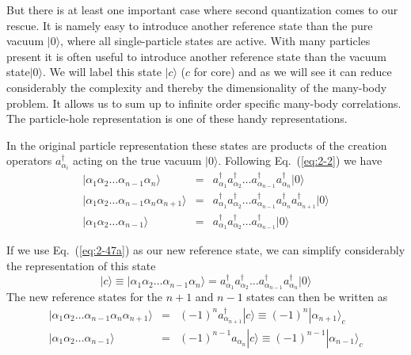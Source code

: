 But there is at least one important case where second quantization comes to our rescue.
It is namely easy to introduce another reference state than the pure vacuum $|0\rangle $, where all single-particle states are active.
With many particles present it is often useful to introduce another reference state  than the vacuum state$|0\rangle $. We will label this state $|c\rangle$ ($c$ for core) and as we will see it can reduce 
considerably the complexity and thereby the dimensionality of the many-body problem. It allows us to sum up to infinite order specific many-body correlations.  The particle-hole representation is one of these handy representations. 

In the original particle representation these states are products of the creation operators  $a_{\alpha_i}^\dagger$ acting on the true vacuum $|0\rangle $.
Following Eq.~(\ref{eq:2-2}) we have 
\begin{align}
 |\alpha_1\alpha_2\dots\alpha_{n-1}\alpha_n\rangle &=& a_{\alpha_1}^\dagger a_{\alpha_2}^\dagger \dots
					a_{\alpha_{n-1}}^\dagger a_{\alpha_n}^\dagger |0\rangle  \label{eq:2-47a} \\
	|\alpha_1\alpha_2\dots\alpha_{n-1}\alpha_n\alpha_{n+1}\rangle &=&
		a_{\alpha_1}^\dagger a_{\alpha_2}^\dagger \dots a_{\alpha_{n-1}}^\dagger a_{\alpha_n}^\dagger
		a_{\alpha_{n+1}}^\dagger |0\rangle  \label{eq:2-47b} \\
	|\alpha_1\alpha_2\dots\alpha_{n-1}\rangle &=& a_{\alpha_1}^\dagger a_{\alpha_2}^\dagger \dots
		a_{\alpha_{n-1}}^\dagger |0\rangle  \label{eq:2-47c}
\end{align}

If we use Eq.~(\ref{eq:2-47a}) as our new reference state, we can simplify considerably the representation of 
this state
\begin{equation}
	|c\rangle  \equiv |\alpha_1\alpha_2\dots\alpha_{n-1}\alpha_n\rangle =
		a_{\alpha_1}^\dagger a_{\alpha_2}^\dagger \dots a_{\alpha_{n-1}}^\dagger a_{\alpha_n}^\dagger |0\rangle  \label{eq:2-48a}
\end{equation}
The new reference states for the $n+1$ and $n-1$ states can then be written as
\begin{align}
	|\alpha_1\alpha_2\dots\alpha_{n-1}\alpha_n\alpha_{n+1}\rangle &=& (-1)^n a_{\alpha_{n+1}}^\dagger |c\rangle 
		\equiv (-1)^n |\alpha_{n+1}\rangle_c \label{eq:2-48b} \\
	|\alpha_1\alpha_2\dots\alpha_{n-1}\rangle &=& (-1)^{n-1} a_{\alpha_n} |c\rangle  
		\equiv (-1)^{n-1} |\alpha_{n-1}\rangle_c \label{eq:2-48c} 
\end{align}

